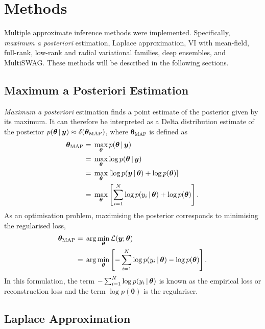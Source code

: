 \section{Methods}\label{ssec:methods}

Multiple approximate inference methods were implemented.
Specifically, \emph{maximum a posteriori} estimation, Laplace approximation, VI with mean-field, full-rank, low-rank and radial variational families, deep ensembles, and MultiSWAG.
These methods will be described in the following sections.

\subsection{Maximum a Posteriori Estimation}

\emph{Maximum a posteriori} estimation finds a point estimate of the posterior given by its maximum.
It can therefore be interpreted as a Delta distribution estimate of the posterior \(p(\bm \theta \, | \, \bm y) \approx \delta(\bm \theta_\mathrm{MAP})\), where \(\bm \theta_{\text{MAP}}\) is defined as
\begin{align}
    \bm \theta_\mathrm{MAP}
    ={} & \max_{\bm \theta} p(\bm \theta \, | \, \bm y) \nonumber                                            \\
    ={} & \max_{\bm \theta} \log p(\bm \theta \, | \, \bm y) \nonumber                                       \\
    ={} & \max_{\bm \theta} \left[ \log p(\bm y \, | \, \bm \theta) + \log p(\bm \theta) \right] \nonumber   \\
    ={} & \max_{\bm \theta} \left[ \sum_{i=1}^N \log p(y_i \, | \, \bm \theta) + \log p(\bm \theta) \right].
\end{align}
As an optimisation problem, maximising the posterior corresponds to minimising the regularised loss,
\begin{align}
    \bm \theta_{\text{MAP}} ={} & \arg \min_{\bm \theta} \mathcal{L}(\bm y; \bm \theta)                                                   \\
    ={}                         & \arg \min_{\bm \theta} \left[ -\sum_{i=1}^N \log p(y_i \, | \, \bm \theta) - \log p(\bm \theta) \right].
\end{align}
In this formulation, the term \(-\sum_{i=1}^N \log p(y_i \, | \, \bm \theta)\) is known as the empirical loss or reconstruction loss and the term \(\log p(\bm \theta)\) is the regulariser.

\subsection{Laplace Approximation}

